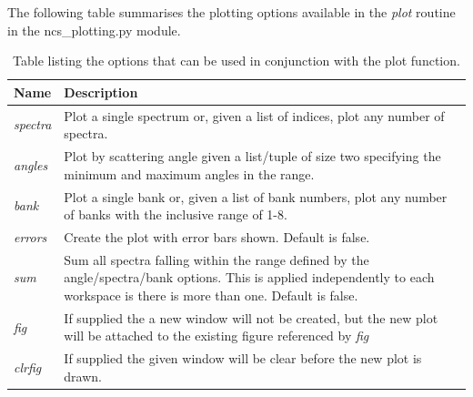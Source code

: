 \documentclass[paper=a4, fontsize=11pt]{scrartcl}	%
\numberwithin{equation}{section}															%
\numberwithin{figure}{section}																%
\numberwithin{table}{section}
\begin{document}
\begin{appendices}
The following table summarises the plotting options available in the \textit{plot} routine in the ncs\_plotting.py module.
\begin{table}[H]
\centering
\begin{tabular}{ l p{15cm}}
Name & Description \\ \hline
\textit{spectra} & Plot a single spectrum or, given a list of indices, plot any number of spectra. \\ \hline
\textit{angles} & Plot by scattering angle given a list/tuple of size two specifying the minimum and maximum angles in the range. \\ \hline
\textit{bank} & Plot a single bank or, given a list of bank numbers, plot any number of banks with the inclusive range of 1-8. \\ \hline
\textit{errors} & Create the plot with error bars shown. Default is false. \\ \hline
\textit{sum} & Sum all spectra falling within the range defined by the angle/spectra/bank options. This is applied independently to each workspace is there is more than one. Default is false.\\ \hline
\textit{fig} & If supplied the a new window will not be created, but the new plot will be attached to the existing figure referenced by \textit{fig}\\ \hline
\textit{clrfig} & If supplied the given window will be clear before the new plot is drawn. \\ \hline
\end{tabular}
\caption{Table listing the options that can be used in conjunction with the plot function.}
\label{table:plotting-parameters}
\end{table}

\end{appendices}
\end{document}
